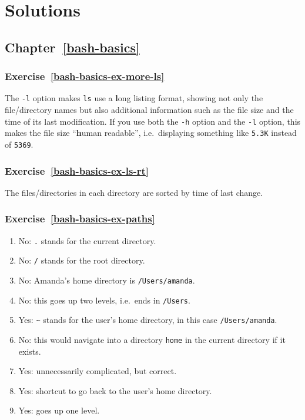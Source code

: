 \documentclass[
]{krantz}
\providecommand{\tightlist}{%
  \setlength{\itemsep}{0pt}\setlength{\parskip}{0pt}}
\begin{document}
\hypertarget{solutions}{%
\chapter{Solutions}\label{solutions}}

\hypertarget{chapter-refbash-basics}{%
\section*{Chapter~\ref{bash-basics}}\label{chapter-refbash-basics}}

\hypertarget{exercise-refbash-basics-ex-more-ls}{%
\subsection*{Exercise~\ref{bash-basics-ex-more-ls}}\label{exercise-refbash-basics-ex-more-ls}}


The \texttt{-l} option makes \texttt{ls} use a \textbf{l}ong listing format, showing not only
the file/directory names but also additional information such as the file size
and the time of its last modification. If you use both the \texttt{-h} option and the \texttt{-l} option,
this makes the file size ``\textbf{h}uman readable'', i.e.~displaying something like \texttt{5.3K}
instead of \texttt{5369}.

\hypertarget{exercise-refbash-basics-ex-ls-rt}{%
\subsection*{Exercise~\ref{bash-basics-ex-ls-rt}}\label{exercise-refbash-basics-ex-ls-rt}}


The files/directories in each directory are sorted by time of last change.

\hypertarget{exercise-refbash-basics-ex-paths}{%
\subsection*{Exercise~\ref{bash-basics-ex-paths}}\label{exercise-refbash-basics-ex-paths}}


\begin{enumerate}
\def\labelenumi{\arabic{enumi}.}
\tightlist
\item
  No: \texttt{.} stands for the current directory.
\item
  No: \texttt{/} stands for the root directory.
\item
  No: Amanda's home directory is \texttt{/Users/amanda}.
\item
  No: this goes up two levels, i.e.~ends in \texttt{/Users}.
\item
  Yes: \texttt{\textasciitilde{}} stands for the user's home directory, in this case \texttt{/Users/amanda}.
\item
  No: this would navigate into a directory \texttt{home} in the current directory if it exists.
\item
  Yes: unnecessarily complicated, but correct.
\item
  Yes: shortcut to go back to the user's home directory.
\item
  Yes: goes up one level.
\end{enumerate}
\end{document}
